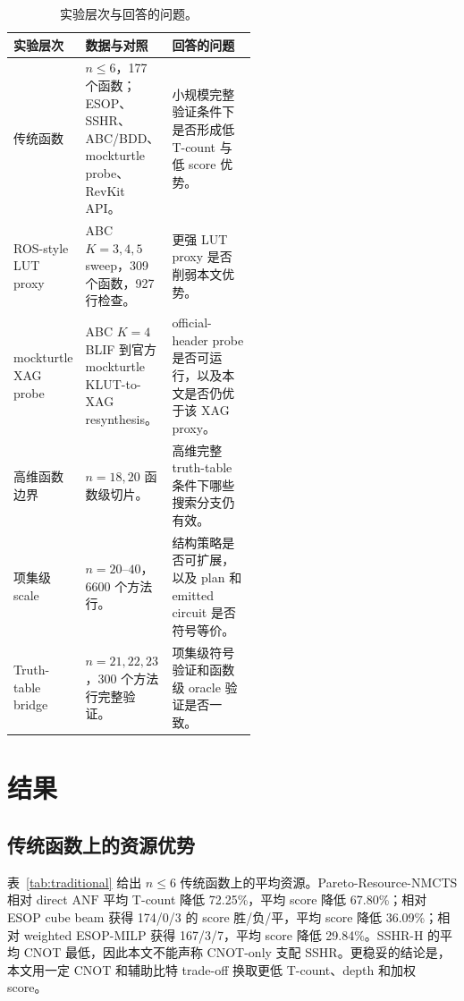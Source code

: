 \documentclass[UTF8,fontset=macnew,11pt]{ctexart}
\newcommand{\method}{Resource-NMCTS}
\newcommand{\anf}{\ensuremath{\mathrm{ANF}}}
\begin{document}
\begin{table}[H]
\centering
\scriptsize
\caption{实验层次与回答的问题。}
\label{tab:experiment-layers}
\begin{tabularx}{\linewidth}{>{\raggedright\arraybackslash}p{0.23\linewidth}>{\raggedright\arraybackslash}p{0.31\linewidth}>{\raggedright\arraybackslash}X}
\toprule
实验层次 & 数据与对照 & 回答的问题 \\
\midrule
传统函数 & $n\leq6$，177 个函数；ESOP、SSHR、ABC/BDD、mockturtle probe、RevKit API。 & 小规模完整验证条件下是否形成低 T-count 与低 score 优势。 \\
ROS-style LUT proxy & ABC $K=3,4,5$ sweep，309 个函数，927 行检查。 & 更强 LUT proxy 是否削弱本文优势。 \\
mockturtle XAG probe & ABC $K=4$ BLIF 到官方 mockturtle KLUT-to-XAG resynthesis。 & official-header probe 是否可运行，以及本文是否仍优于该 XAG proxy。 \\
高维函数边界 & $n=18,20$ 函数级切片。 & 高维完整 truth-table 条件下哪些搜索分支仍有效。 \\
项集级 scale & $n=20$--$40$，6600 个方法行。 & 结构策略是否可扩展，以及 plan 和 emitted circuit 是否符号等价。 \\
Truth-table bridge & $n=21,22,23$，300 个方法行完整验证。 & 项集级符号验证和函数级 oracle 验证是否一致。 \\
\bottomrule
\end{tabularx}
\end{table}

\section{结果}

\subsection{传统函数上的资源优势}

表~\ref{tab:traditional} 给出 $n\leq6$ 传统函数上的平均资源。Pareto-\method{} 相对 direct \anf{} 平均 T-count 降低 72.25\%，平均 score 降低 67.80\%；相对 ESOP cube beam 获得 174/0/3 的 score 胜/负/平，平均 score 降低 36.09\%；相对 weighted ESOP-MILP 获得 167/3/7，平均 score 降低 29.84\%。SSHR-H 的平均 CNOT 最低，因此本文不能声称 CNOT-only 支配 SSHR。更稳妥的结论是，本文用一定 CNOT 和辅助比特 trade-off 换取更低 T-count、depth 和加权 score。
\end{document}

